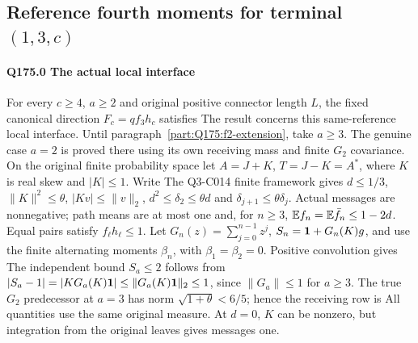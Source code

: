 \subsection{Reference fourth moments for terminal $(1,\allowbreak 3,\allowbreak c)$}\label{proof:Q5-C175}
\paragraph{Q175.0 The actual local interface}\label{part:Q175.0}
For every $c\ge\allowbreak 4$, $a\ge\allowbreak 2$ and original positive connector length $L$,
the fixed canonical direction $F_c=\allowbreak qf_3h_c$ satisfies
The result concerns this same-reference local interface.
Until paragraph~\ref{part:Q175:f2-extension}, take \(a\ge3\).
The genuine case \(a=2\) is proved there using its own receiving
mass and finite \(G_2\) covariance.
On the original finite probability space let $A=\allowbreak J+K$, $T=\allowbreak J-K=\allowbreak A^*$,
where $K$ is real skew and $|K|\le\allowbreak 1$. Write
The Q3-C014 finite framework gives $d\le\allowbreak 1/3$, $\|K\|^2\le\allowbreak \theta$,
$|Kv|\le\allowbreak \|v\|_2$, $d^2\le\allowbreak \delta_2\le\allowbreak \theta d$ and
$\delta_{j+1}\le\allowbreak \theta\delta_j$. Actual messages are nonnegative;
path means are at most one and, for $n\ge\allowbreak 3$,
$\mathbb E f_n=\allowbreak \mathbb E\bar f_n\le\allowbreak 1-2d$. Equal pairs satisfy $f_\ell h_\ell\le\allowbreak 1$.
Let $G_n(z)=\allowbreak \sum_{j=\allowbreak 0}^{n-1}z^j$, $S_n=\allowbreak \mathbf1+G_n(K)g$, and use
the finite alternating moments $\beta_n$, with $\beta_1=\allowbreak \beta_2=\allowbreak 0$.
Positive convolution gives
The independent bound $S_a\le\allowbreak 2$ follows from
$|S_a-1|=\allowbreak |KG_a(K)\mathbf1|\le\allowbreak \|G_a(K)\mathbf1\|_2\le\allowbreak 1$, since
$\|G_a\|\le\allowbreak 1$ for $a\ge\allowbreak 3$. The true $G_2$ predecessor at $a=\allowbreak 3$
has norm $\sqrt{1+\theta}<\allowbreak 6/5$; hence the receiving row is
All quantities use the same original measure. At $d=\allowbreak 0$, $K$ can be
nonzero, but integration from the original leaves gives messages one.

